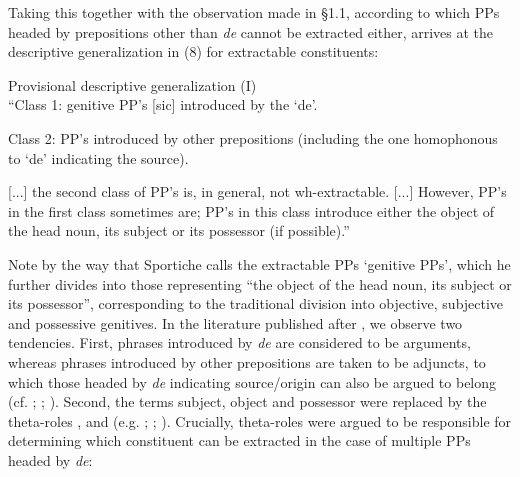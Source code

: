 \documentclass[output=paper]{langsci/langscibook}
\begin{document}
\ea%
    \label{ex:mensch:7}
    \z
\z

Taking this together with the observation made in §1.1, according to which PPs headed by prepositions other than \textit{de} cannot be extracted either, \citet{Sportiche1981} arrives at the descriptive generalization in (8) for extractable constituents:

\begin{exe}
\ex%
\label{ex:mensch:8}
Provisional descriptive generalization (I)\\
\noindent “Class 1: genitive PP’s [sic] introduced by the  ‘de’.

Class 2: PP’s introduced by other prepositions (including the one homophonous to ‘de’ indicating the source).

[...] the second class of PP’s is, in general, not wh-extractable. [...] However, PP’s in the first class sometimes are; PP’s in this class introduce either the object of the head noun, its subject or its possessor (if possible).” \citep[225]{Sportiche1981}
\end{exe}

Note by the way that Sportiche calls the extractable PPs ‘genitive PPs’, which he further divides into those representing “the object of the head noun, its subject or its possessor”, corresponding to the traditional division into objective, subjective and possessive genitives. In the literature published after \citet{Sportiche1981}, we observe two tendencies. First, phrases introduced by \textit{de} are considered to be arguments, whereas phrases introduced by other prepositions are taken to be adjuncts, to which those headed by \textit{de} indicating source/origin can also be argued to belong (cf. \citealt{Cinque1990}; \citealt{Moritz1994}; \citealt[586]{Alexiadou2007Noun}). Second, the terms subject, object and possessor were replaced by the theta-roles \AGENT, \THEME and \POSSESSOR (e.g. \citealt{Pollock1989}; \citealt{Valois1991}; \citealt{Godard1992}). Crucially, theta-roles were argued to be responsible for determining which constituent can be extracted in the case of multiple PPs headed by \textit{de}:
\end{document}

